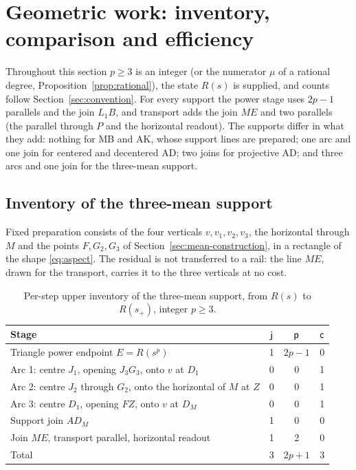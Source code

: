 \section{Geometric work: inventory, comparison and efficiency}\label{sec:work}

Throughout this section $p\ge3$ is an integer (or the numerator $\mu$ of a rational degree,
Proposition~\ref{prop:rational}), the state $R(s)$ is supplied, and counts follow
Section~\ref{sec:convention}. For every support the power stage uses $2p-1$ parallels and the join
$L_1B$, and transport adds the join $ME$ and two parallels (the parallel through $P$ and the horizontal
readout). The supports differ in what they add: nothing for MB and AK, whose support lines are
prepared; one arc and one join for centered and decentered AD; two joins for projective AD; and three
arcs and one join for the three-mean support.

\subsection{Inventory of the three-mean support}

Fixed preparation consists of the four verticals $v,v_1,v_2,v_3$, the horizontal through $M$ and the
points $F,G_2,G_3$ of Section~\ref{sec:mean-construction}, in a rectangle of the shape
\eqref{eq:aspect}. The residual is not transferred to a rail: the line $ME$, drawn for the transport,
carries it to the three verticals at no cost.

\begin{table}[h]
\centering\small
\caption{Per-step upper inventory of the three-mean support, from $R(s)$ to $R(s_+)$, integer
$p\ge3$.}\label{tab:mean-inventory}
\begin{tabular}{@{}lccc@{}}
\toprule
Stage & $\mathsf{j}$ & $\mathsf{p}$ & $\mathsf{c}$\\
\midrule
Triangle power endpoint $E=R(s^{p})$ & 1 & $2p-1$ & 0\\
Arc 1: centre $J_1$, opening $J_3G_3$, onto $v$ at $D_1$ & 0 & 0 & 1\\
Arc 2: centre $J_2$ through $G_2$, onto the horizontal of $M$ at $Z$ & 0 & 0 & 1\\
Arc 3: centre $D_1$, opening $FZ$, onto $v$ at $D_M$ & 0 & 0 & 1\\
Support join $AD_M$ & 1 & 0 & 0\\
Join $ME$, transport parallel, horizontal readout & 1 & 2 & 0\\
\midrule
Total & 3 & $2p+1$ & 3\\
\bottomrule
\end{tabular}
\end{table}

